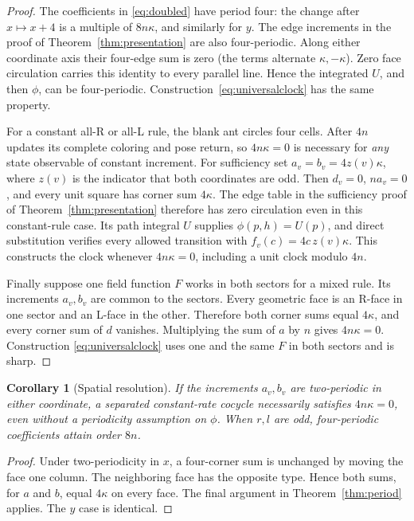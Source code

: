 \documentclass[11pt]{article}
\newtheorem{corollary}[theorem]{Corollary}
\theoremstyle{definition}
\begin{document}
\begin{proof}
The coefficients in \eqref{eq:doubled} have period four: the change after
$x\mapsto x+4$ is a multiple of $8n\kappa$, and similarly for $y$. The edge
increments in the proof of Theorem~\ref{thm:presentation} are also
four-periodic. Along either coordinate axis their four-edge sum is zero
(the terms alternate $\kappa,-\kappa$). Zero face circulation carries this
identity to every parallel line. Hence the integrated $U$, and then $\phi$,
can be four-periodic. Construction~\eqref{eq:universalclock} has the same
property.

For a constant all-R or all-L rule, the blank ant circles four cells. After
$4n$ updates its complete coloring and pose return, so $4n\kappa=0$ is
necessary for \emph{any} state observable of constant increment. For sufficiency set $a_v=b_v=4z(v)\kappa$, where $z(v)$ is the indicator
that both coordinates are odd. Then $d_v=0$, $na_v=0$, and every unit square
has corner sum $4\kappa$. The edge table in the sufficiency proof of
Theorem~\ref{thm:presentation} therefore has zero circulation even in this
constant-rule case. Its path integral $U$ supplies $\phi(p,h)=U(p)$, and direct
substitution verifies every allowed transition with
$f_v(c)=4c\,z(v)\kappa$. This constructs the clock whenever $4n\kappa=0$,
including a unit clock modulo $4n$.

Finally suppose one field function $F$ works in both sectors for a mixed
rule. Its increments $a_v,b_v$ are common to the sectors. Every geometric
face is an R-face in one sector and an L-face in the other. Therefore both
corner sums equal $4\kappa$, and every corner sum of $d$ vanishes. Multiplying
the sum of $a$ by $n$ gives $4n\kappa=0$. Construction
\eqref{eq:universalclock} uses one and the same $F$ in both sectors and is sharp.
\end{proof}

\begin{corollary}[Spatial resolution]\label{cor:resolution}
If the increments $a_v,b_v$ are two-periodic in either coordinate, a separated
constant-rate cocycle necessarily satisfies $4n\kappa=0$, even without a
periodicity assumption on $\phi$. When $r,l$ are odd, four-periodic coefficients
attain order $8n$.
\end{corollary}
\begin{proof}
Under two-periodicity in $x$, a four-corner sum is unchanged by moving the face
one column. The neighboring face has the opposite type. Hence both sums,
for $a$ and $b$, equal $4\kappa$ on every face. The final argument in
Theorem~\ref{thm:period} applies. The $y$ case is identical.
\end{proof}
\end{document}
